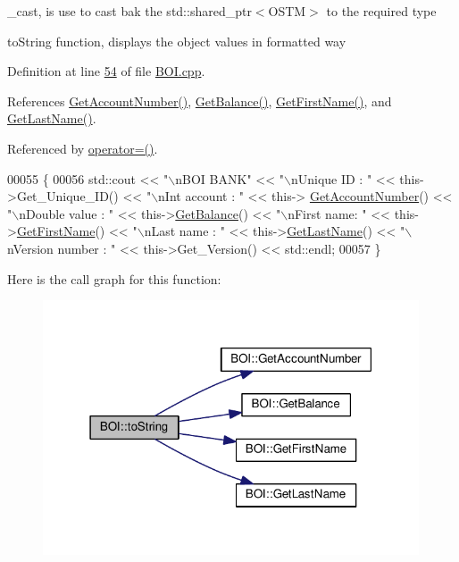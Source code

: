 \+\_\+cast, is use to cast bak the std\+::shared\+\_\+ptr$<$\+O\+S\+T\+M$>$ to the required type 

to\+String function, displays the object values in formatted way 

Definition at line \hyperlink{_b_o_i_8cpp_source_l00054}{54} of file \hyperlink{_b_o_i_8cpp_source}{B\+O\+I.\+cpp}.



References \hyperlink{_b_o_i_8cpp_source_l00078}{Get\+Account\+Number()}, \hyperlink{_b_o_i_8cpp_source_l00070}{Get\+Balance()}, \hyperlink{_b_o_i_8cpp_source_l00094}{Get\+First\+Name()}, and \hyperlink{_b_o_i_8cpp_source_l00086}{Get\+Last\+Name()}.



Referenced by \hyperlink{_b_o_i_8h_source_l00065}{operator=()}.


\begin{DoxyCode}
00055 \{
00056    std::cout << \textcolor{stringliteral}{"\(\backslash\)nBOI BANK"} << \textcolor{stringliteral}{"\(\backslash\)nUnique ID : "} << this->Get\_Unique\_ID() << \textcolor{stringliteral}{"\(\backslash\)nInt account : "} << this->
      \hyperlink{class_b_o_i_a5b18e1538f3d37835234946cdf9f240f}{GetAccountNumber}() << \textcolor{stringliteral}{"\(\backslash\)nDouble value : "} << this->\hyperlink{class_b_o_i_a25b289dece2a1685bb9d1a9332c9be0b}{GetBalance}() << \textcolor{stringliteral}{"\(\backslash\)nFirst name:
       "} << this->\hyperlink{class_b_o_i_ab4b9d50c6008a666aa4382def580e7d1}{GetFirstName}() << \textcolor{stringliteral}{"\(\backslash\)nLast name : "} << this->\hyperlink{class_b_o_i_a37828f3fa4a32f522966e2cad90eaab2}{GetLastName}()  << \textcolor{stringliteral}{"\(\backslash\)nVersion
       number : "} << this->Get\_Version() << std::endl;
00057 \}
\end{DoxyCode}


Here is the call graph for this function\+:\nopagebreak
\begin{figure}[H]
\begin{center}
\leavevmode
\includegraphics[width=316pt]{class_b_o_i_ab02a4dd4ebcc5b2abfaca19f2dff2006_cgraph}
\end{center}
\end{figure}




